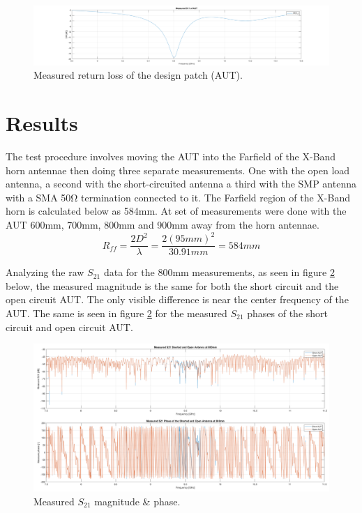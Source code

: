     \begin{figure}[H]
    \centering
    \includegraphics[width=0.99\linewidth]{Figures/chp4_AUT_S11.png}
    \caption{Measured return loss of the design patch (AUT).}
    \label{fig:chp4_AUT_S11}
    \end{figure}

\section{Results}
The test procedure involves moving the AUT into the Farfield of the X-Band horn antennae then doing three separate measurements. One with the open load antenna, a second with the short-circuited antenna a third with the SMP antenna with a SMA 50Ω termination connected to it. The Farfield region of the X-Band horn is calculated below as 584mm. At set of measurements were done with the AUT 600mm, 700mm, 800mm and 900mm away from the horn antennae.
    \[R_{ff}=\frac{2D^2}{\lambda}=\frac{2{(95mm)}^2}{30.91mm}=584mm\]

Analyzing the raw \(S_{21}\) data for the 800mm measurements, as seen in figure \ref{fig:chp4_Raw_results} below, the measured magnitude is the same for both the short circuit and the open circuit AUT. The only visible difference is near the center frequency of the AUT. The same is seen in figure \ref{fig:chp4_Raw_results} for the measured \(S_{21}\) phases of the short circuit and open circuit AUT. 

    \begin{figure}[H]
    \centering
    \includegraphics[width=0.99\linewidth]{Figures/chp4_Raw_results.png}
    \caption{Measured \(S_{21}\) magnitude \& phase.}
    \label{fig:chp4_Raw_results}
    \end{figure}

